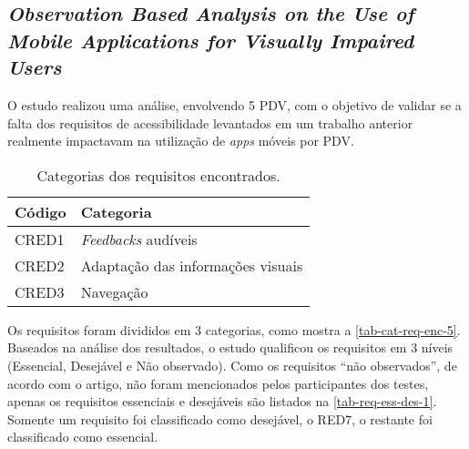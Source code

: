 \subsection{\emph{Observation Based Analysis on the Use of Mobile Applications for Visually Impaired Users}}

O estudo realizou uma análise, envolvendo 5 PDV, com o objetivo de validar se a falta dos requisitos de acessibilidade levantados em um trabalho anterior realmente impactavam na utilização de \emph{apps} móveis por PDV.

\begin{table}[htb]
  \begin{center}
    \ABNTEXfontereduzida
    \caption{Categorias dos requisitos encontrados.}
    \label{tab-cat-req-enc-5}
    \begin{tabular}{p{2.0cm}|p{5.0cm}}
      \textbf{Código} & \textbf{Categoria}                \\
      \hline
      CRED1           & \emph{Feedbacks} audíveis         \\
      \hline
      CRED2           & Adaptação das informações visuais \\
      \hline
      CRED3           & Navegação                         \\
    \end{tabular}
  \end{center}
\end{table}

Os requisitos foram divididos em 3 categorias, como mostra a \autoref{tab-cat-req-enc-5}.
Baseados na análise dos resultados, o estudo qualificou os requisitos em 3 níveis (Essencial, Desejável e Não observado).
Como os requisitos ``não observados'', de acordo com o artigo, não foram mencionados pelos participantes dos testes, apenas os requisitos essenciais e desejáveis são listados na \autoref{tab-req-ess-des-1}.
Somente um requisito foi classificado como desejável, o RED7, o restante foi classificado como essencial.

